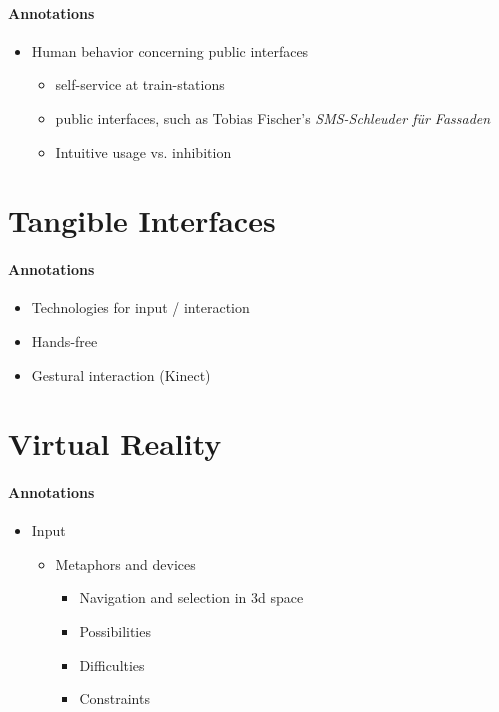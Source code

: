 \paragraph{Annotations}

\begin{itemize}
	\item Human behavior concerning public interfaces
	\begin{itemize}
		\item self-service at train-stations
		\item public interfaces, such as Tobias Fischer's \textit{SMS-Schleuder für Fassaden}
		\item Intuitive usage vs. inhibition
	\end{itemize}
\end{itemize}

\section{Tangible Interfaces}
\label{related_work_tangible}

\paragraph{Annotations}

\begin{itemize}
	\item Technologies for input / interaction
	\item Hands-free
	\item Gestural interaction (Kinect)
\end{itemize}



\section{Virtual Reality}
\label{related_work_vr}

\paragraph{Annotations}

\begin{itemize}
	\item Input
	\begin{itemize}
		\item Metaphors and devices
		\begin{itemize}
			\item Navigation and selection in 3d space
			\item Possibilities
			\item Difficulties
			\item Constraints
		\end{itemize}
	\end{itemize}
\end{itemize}
